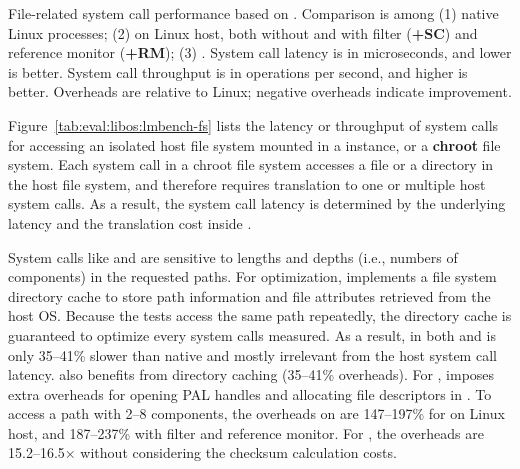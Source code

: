 \label{sec:eval:libos:fs}


\begin{table}[t!b!]

\caption{File-related system call performance based on \lmbench{}. 
Comparison is among (1) native Linux processes; (2) \graphene{} on Linux host, both without and with \seccomp{} filter ({\bf +SC}) and reference monitor ({\bf +RM}); (3) \graphenesgx{}.
System call latency is in microseconds, and lower is better.
System call throughput is in operations per second, and higher is better. 
Overheads are relative to Linux; negative overheads indicate improvement.} 
\label{tab:eval:libos:lmbench-fs}
\end{table}



Figure~\ref{tab:eval:libos:lmbench-fs}
lists the latency or throughput of system calls
for accessing an isolated host file system mounted in a \thelibos{} instance,
or a {\bf chroot} file system.
Each system call in a chroot file system
accesses a file or a directory in the host file system,
and therefore requires
translation to one or multiple
host system calls.
As a result, the system call latency
is determined by the underlying \hostapi{} latency and the translation cost inside \thelibos{}.



System calls like  and 
are sensitive to lengths and depths (i.e., numbers of components) in the requested paths.
For optimization,
\thelibos{} implements a file system directory cache
to store path information and file attributes retrieved from the host OS.
Because the \lmbench{} tests %
access the same path repeatedly,
the directory cache
is guaranteed to optimize every system calls measured.
As a result,
 in both \graphene{} and \graphenesgx{} is only 35--41\% slower than native
and mostly irrelevant from the host system call latency. 
 also benefits from directory caching
(35--41\% overheads).
For , %
\graphene{} imposes
extra overheads for opening PAL handles and allocating file descriptors in \thelibos{}.
To access a path with 2--8 components,
the overheads on  are 147--197\% for \graphene{} on Linux host, and 187--237\% with \seccomp{} filter and reference monitor.
For \graphenesgx{}, the overheads are 15.2--16.5$\times$
without considering the checksum calculation costs.


